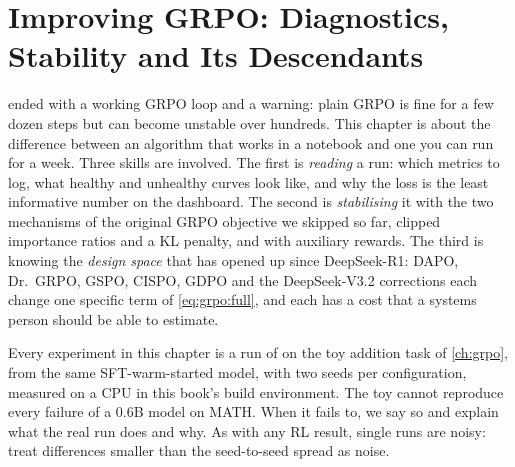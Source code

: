 \chapter{Improving GRPO: Diagnostics, Stability and Its Descendants}\label{ch:grpo2}

 ended with a working GRPO loop and a warning: plain GRPO is fine for a few
dozen steps but can become unstable over hundreds. This chapter is about the difference
between an algorithm that works in a notebook and one you can run for a week. Three skills
are involved. The first is \emph{reading} a run: which metrics to log, what healthy and
unhealthy curves look like, and why the loss is the least informative number on the
dashboard. The second is \emph{stabilising} it with the two mechanisms of the original GRPO
objective we skipped so far, clipped importance ratios and a KL penalty, and with auxiliary
rewards. The third is knowing the \emph{design space} that has opened up since DeepSeek-R1:
DAPO, Dr.~GRPO, GSPO, CISPO, GDPO and the DeepSeek-V3.2 corrections each change one
specific term of \cref{eq:grpo:full}, and each has a cost that a systems person should be
able to estimate.

Every experiment in this chapter is a run of  on the toy
addition task of \cref{ch:grpo}, from the same SFT-warm-started model, with two seeds per
configuration, measured on a CPU in this book's build environment. The toy cannot reproduce
every failure of a 0.6B model on MATH. When it fails to, we say so and explain what the real
run does and why. As with any RL result, single runs are noisy: treat differences smaller
than the seed-to-seed spread as noise.

